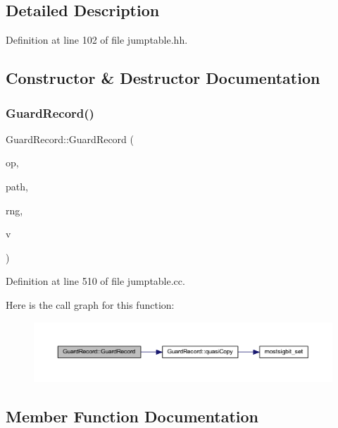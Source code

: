 \subsection{Detailed Description}


Definition at line 102 of file jumptable.\+hh.



\subsection{Constructor \& Destructor Documentation}
\mbox{\label{class_guard_record_a563f342394c9dd23e2b6844cc2005731}} 
\subsubsection{\texorpdfstring{GuardRecord()}{GuardRecord()}}
{\footnotesize\ttfamily Guard\+Record\+::\+Guard\+Record (\begin{DoxyParamCaption}\item[{\mbox{\hyperlink{class_pcode_op}{Pcode\+Op}} $\ast$}]{op,  }\item[{int4}]{path,  }\item[{const \mbox{\hyperlink{class_circle_range}{Circle\+Range}} \&}]{rng,  }\item[{\mbox{\hyperlink{class_varnode}{Varnode}} $\ast$}]{v }\end{DoxyParamCaption})}



Definition at line 510 of file jumptable.\+cc.

Here is the call graph for this function\+:
\nopagebreak
\begin{figure}[H]
\begin{center}
\leavevmode
\includegraphics[width=350pt]{class_guard_record_a563f342394c9dd23e2b6844cc2005731_cgraph}
\end{center}
\end{figure}


\subsection{Member Function Documentation}
\mbox{\label{class_guard_record_a0a8baf99a2c1c3119a5d1c43426e6308}} 
